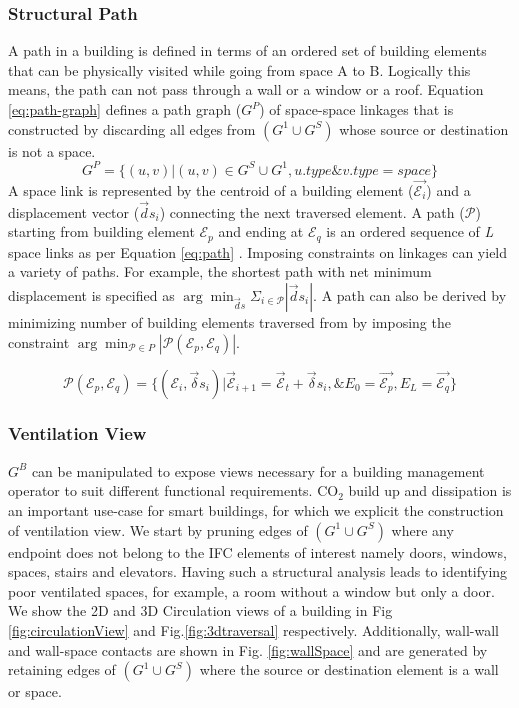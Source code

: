 \documentclass[conference]{IEEEtran}
\begin{document}
\subsubsection{Structural Path }
A path in a building is defined in terms of an ordered set of building elements that can be physically visited while going from space A to B. Logically this means, the path can not pass through a wall or a window or a roof. Equation \ref{eq:path-graph} defines a path graph ($G^P$) of space-space linkages that is constructed  by discarding all edges from $(G^1 \cup G^S)$ whose source or destination is not a space.
\begin{equation}
G^P = \{ (u,v)| (u,v) \in G^S \cup G^1,  u.type \& v.type = space  \}
\label{eq:path-graph}
\end{equation}
A space link is represented by the centroid of a building element ($\vec{\mathcal{E}_i}$) and a displacement vector ($\vec{d}s_i$) connecting the next traversed element. A path ($\mathcal{P}$) starting from building element $\mathcal{E}_p$ and ending at $\mathcal{E}_q$ is an ordered sequence of \textit{L} space links as per Equation \ref{eq:path} . Imposing constraints on linkages can yield a variety of paths. For example, the shortest path with net minimum displacement is specified as $\arg \min_{\vec{d}s}\Sigma_{i \in \mathcal{P}} |\vec{d}s_i|$. A path can also be derived by minimizing number of building elements traversed from by imposing the constraint $ \arg \min_{\mathcal{P} \in P}|  \mathcal{P} (\mathcal{E}_p, \mathcal{E}_q)|$. 

\begin{equation} 
 \mathcal{P}(\mathcal{E}_p, \mathcal{E}_q)  =  \{(\mathcal{E}_{i}, \vec{\delta}s_i)|\vec{\mathcal{E}}_{i+1} = \vec{ \mathcal{E}}_{t} + \vec{\delta} s_i ,
 \& E_0 = \vec{\mathcal{E}_p}, E_L = \vec{\mathcal{E}_q}   \} 
 \label{eq:path}
\end{equation}

\subsubsection{Ventilation View}

$G^B $ can be manipulated to expose views necessary for a building management operator to suit different functional requirements. CO$_2$ build up and dissipation is an important use-case for smart buildings, for which we explicit the construction of ventilation view. We start by pruning edges of $(G^1 \cup G^S)$ where any endpoint does not belong to the IFC elements of interest namely doors, windows, spaces, stairs and elevators. Having such a structural analysis leads to identifying poor ventilated spaces, for example, a room without a window but only a door.  We show the 2D and 3D Circulation views of a building in  Fig \ref{fig:circulationView} and Fig.\ref{fig:3dtraversal} respectively.   Additionally, wall-wall and wall-space contacts are shown in Fig.  \ref{fig:wallSpace} and are generated by retaining edges of $(G^1 \cup G^S)$ where the source or destination element is a wall or space.
\end{document}

